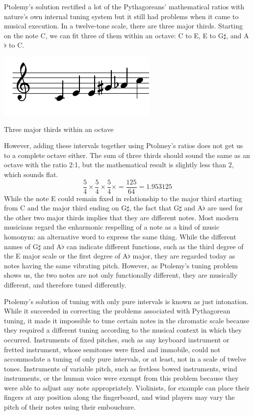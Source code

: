 Ptolemy's solution rectified a lot of the Pythagoreans' mathematical ratios with nature's
own internal tuning system but it still had problems when it came to musical execution.
In a twelve-tone scale, there are three major thirds. Starting on the note C, we can fit
three of them within an octave: C to E, E to G$\sharp$, and A$\flat$ to C.
\begin{example}[h]
\centering
\includegraphics{examples/thirds.pdf}
\caption{Three major thirds within an octave}
\end{example}
However, adding these intervals together using Ptolmey's ratios does not get us to a
complete octave either. The sum of three thirds should sound the same as an octave with
the ratio 2:1, but the mathematical result is slightly less than 2, which sounds flat.
\begin{equation}
  \frac{5}{4} \times
  \frac{5}{4} \times
  \frac{5}{4} \times = \frac{125}{64} = 1.953125
\end{equation}
While the note E could remain fixed in relationship to the major third starting from C and
the major third ending on G$\sharp$, the fact that G$\sharp$ and A$\flat$ are used for the other
two major thirds implies that they are different notes. Most modern musicians regard the
enharmonic respelling of a note as a kind of music homonym: an alternative word to express
the same thing. While the different names of G$\sharp$ and A$\flat$ can indicate different
functions, such as the third degree of the E major scale or the first degree of A$\flat$
major, they are regarded today as notes having the same vibrating pitch. However, as
Ptolemy's tuning problem shows us, the two notes are not only functionally different, they
are musically different, and therefore tuned differently.

Ptolemy's solution of tuning with only pure intervals is known as just intonation. While it succeeded in correcting the
problems associated with Pythagorean tuning, it made it impossible to tune certain notes in the chromatic scale because
they required a different tuning according to the musical context in which they occurred. Instruments of fixed pitches,
such as any keyboard instrument or fretted instrument, whose semitones were fixed and immobile, could not accommodate a
tuning of only pure intervals, or at least, not in a scale of twelve tones. Instruments of variable pitch, such as
fretless bowed instruments, wind instruments, or the human voice were exempt from this problem because they were able to
adjust any note appropriately. Violinists, for example can place their fingers at any position along the fingerboard,
and wind players may vary the pitch of their notes using their embouchure.

